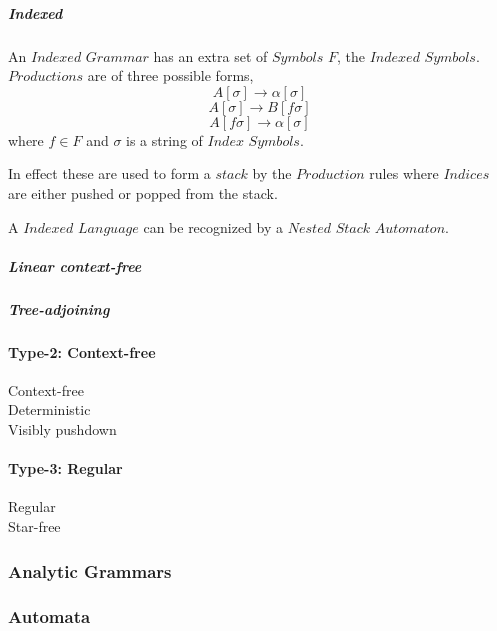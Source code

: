 \documentclass{article}
\begin{document}
    \subparagraph{Indexed}

    An $Indexed$ $Grammar$ has an extra set of $Symbols$ $F$, the
    $Indexed$ $Symbols$. $Productions$ are of three possible forms,
    \[
        A[\sigma] \rightarrow \alpha[\sigma]
    \]\[
        A[\sigma] \rightarrow B[f\sigma]
    \]\[
        A[f\sigma] \rightarrow \alpha[\sigma]
    \]
    where $f \in F$ and $\sigma$ is a string of $Index$ $Symbols$.

    In effect these are used to form a $stack$ by the $Production$
    rules where $Indices$ are either pushed or popped from the stack.

    A $Indexed$ $Language$ can be recognized by a $Nested$ $Stack$
    $Automaton$.

    \subparagraph{Linear context-free}

    \subparagraph{Tree-adjoining}

\paragraph{Type-2: Context-free}

    \begin{description}

    \item[Context-free]

    \item[Deterministic]

    \item[Visibly pushdown]

    \end{description}

\paragraph{Type-3: Regular}

    \begin{description}

    \item[Regular]

    \item[Star-free]

    \end{description}

\subsubsection{Analytic Grammars}

\subsubsection{Automata}
\end{document}
